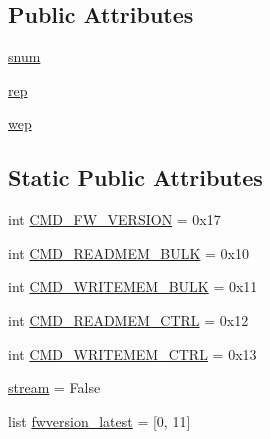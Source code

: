 \subsection*{Public Attributes}
\begin{DoxyCompactItemize}
\item 
\hyperlink{classsoftware_1_1chipwhisperer_1_1hardware_1_1naeusb_1_1naeusb_1_1NAEUSB_a4d5b2d8104aeb0e54615c3392a27a45b}{snum}
\item 
\hyperlink{classsoftware_1_1chipwhisperer_1_1hardware_1_1naeusb_1_1naeusb_1_1NAEUSB_ab6d7a048b0051117e9f0f817e5f20caf}{rep}
\item 
\hyperlink{classsoftware_1_1chipwhisperer_1_1hardware_1_1naeusb_1_1naeusb_1_1NAEUSB_a7eaef2c29dc956759f4911d6e8001375}{wep}
\end{DoxyCompactItemize}
\subsection*{Static Public Attributes}
\begin{DoxyCompactItemize}
\item 
int \hyperlink{classsoftware_1_1chipwhisperer_1_1hardware_1_1naeusb_1_1naeusb_1_1NAEUSB_a998f1478de45c8f74031f1b11b804206}{C\+M\+D\+\_\+\+F\+W\+\_\+\+V\+E\+R\+S\+I\+O\+N} = 0x17
\item 
int \hyperlink{classsoftware_1_1chipwhisperer_1_1hardware_1_1naeusb_1_1naeusb_1_1NAEUSB_ab4975d566df0a1feb3f210cb7b7083cb}{C\+M\+D\+\_\+\+R\+E\+A\+D\+M\+E\+M\+\_\+\+B\+U\+L\+K} = 0x10
\item 
int \hyperlink{classsoftware_1_1chipwhisperer_1_1hardware_1_1naeusb_1_1naeusb_1_1NAEUSB_ad6eb26e1c8e4709ce0b661f0ab96ff23}{C\+M\+D\+\_\+\+W\+R\+I\+T\+E\+M\+E\+M\+\_\+\+B\+U\+L\+K} = 0x11
\item 
int \hyperlink{classsoftware_1_1chipwhisperer_1_1hardware_1_1naeusb_1_1naeusb_1_1NAEUSB_a7f4fc792c07279595a8398b2bf933dc9}{C\+M\+D\+\_\+\+R\+E\+A\+D\+M\+E\+M\+\_\+\+C\+T\+R\+L} = 0x12
\item 
int \hyperlink{classsoftware_1_1chipwhisperer_1_1hardware_1_1naeusb_1_1naeusb_1_1NAEUSB_acbd80a988d495e7dba55b80787af9df2}{C\+M\+D\+\_\+\+W\+R\+I\+T\+E\+M\+E\+M\+\_\+\+C\+T\+R\+L} = 0x13
\item 
\hyperlink{classsoftware_1_1chipwhisperer_1_1hardware_1_1naeusb_1_1naeusb_1_1NAEUSB_ab0bf21f14a983026411fb9bafee6dd91}{stream} = False
\item 
list \hyperlink{classsoftware_1_1chipwhisperer_1_1hardware_1_1naeusb_1_1naeusb_1_1NAEUSB_ae35ad43e228dab0ccf3463ccda8eea34}{fwversion\+\_\+latest} = \mbox{[}0, 11\mbox{]}
\end{DoxyCompactItemize}


